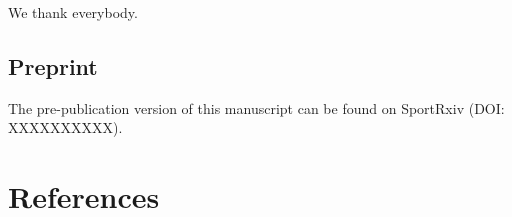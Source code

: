 \documentclass[]{cik}%
\begin{document}
We thank everybody.

\hypertarget{preprint}{%
\subsection{Preprint}\label{preprint}}

The pre-publication version of this manuscript can be found on SportRxiv
(DOI: XXXXXXXXXX).

\newpage

\hypertarget{references}{%
\section{References}\label{references}}

\parindent0pt 
\setlength{\parskip}{1em}

\hypertarget{refs}{}
\end{document}

